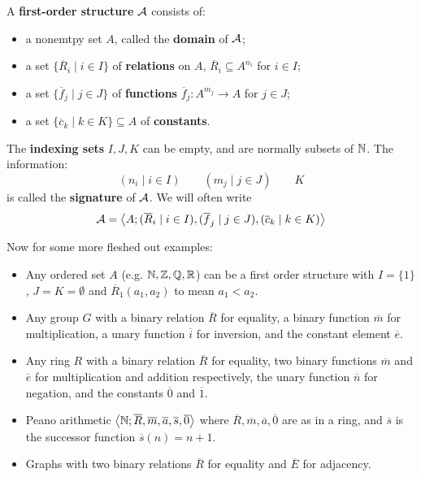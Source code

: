 \documentclass{article}
\begin{document}
\begin{definition}
    A \textbf{first-order structure} $\mathcal{A}$ consists of: \begin{itemize}
        \item a nonemtpy set $A$, called the \textbf{domain} of $\mathcal{A}$;
        \item a set $\{\overline{R}_i \mid i\in I\}$ of \textbf{relations} on $A$, $\overline{R}_i\subseteq A^{n_i}$ for $i\in I$;
        \item a set $\{\overline{f}_j \mid j\in J\}$ of \textbf{functions} $\overline{f}_j:A^{m_j}\rightarrow A$ for $j\in J$;
        \item a set $\{\overline{c}_k \mid k\in K\}\subseteq A$ of \textbf{constants}.
    \end{itemize}
    The \textbf{indexing sets} $I,J,K$ can be empty, and are normally subsets of $\mathbb{N}$. The information: \[
    (n_i\mid i\in I) \qquad (m_j\mid j\in J) \qquad K
    \] is called the \textbf{signature} of $\mathcal{A}$. We will often write \[
    \mathcal{A} = \left\langle A;(\overline{R}_i \mid i\in I), (\overline{f}_j \mid j\in J), (\overline{c}_k \mid k\in K) \right\rangle
    \]
\end{definition}

Now for some more fleshed out examples: \begin{itemize}
    \item Any ordered set $A$ (e.g. $\mathbb{N},\mathbb{Z},\mathbb{Q},\mathbb{R}$) can be a first order structure with $I=\{1\}$, $J=K=\emptyset$ and $\overline{R}_1(a_1,a_2)$ to mean $a_1<a_2$.
    \item Any group $G$ with a binary relation $\overline{R}$ for equality, a binary function $\overline{m}$ for multiplication, a unary function $\overline{i}$ for inversion, and the constant element $\overline{e}$.
    \item Any ring $R$ with a binary relation $\overline{R}$ for equality, two binary functions $\overline{m}$ and $\overline{e}$ for multiplication and addition respectively, the unary function $\overline{n}$ for negation, and the constants $\overline{0}$ and $\overline{1}$.
    \item Peano arithmetic $\left\langle \mathbb{N};\overline{R},\overline{m},\overline{a},\overline{s},\overline{0} \right\rangle$ where $\overline{R},\overline{m},\overline{a},\overline{0}$ are as in a ring, and $\overline{s}$ is the successor function $\overline{s}(n)=n+1$.
    \item Graphs with two binary relations $\overline{R}$ for equality and $\overline{E}$ for adjacency.
\end{itemize}
\end{document}
